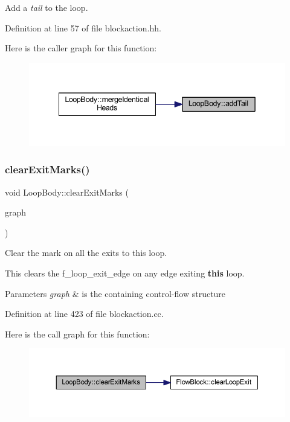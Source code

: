Add a {\itshape tail} to the loop. 



Definition at line 57 of file blockaction.\+hh.

Here is the caller graph for this function\+:
\nopagebreak
\begin{figure}[H]
\begin{center}
\leavevmode
\includegraphics[width=342pt]{class_loop_body_a6f9865236680edf3495208859639ce03_icgraph}
\end{center}
\end{figure}
\mbox{\label{class_loop_body_a0864eadb313ff31a3075bf916018be8e}} 
\subsubsection{\texorpdfstring{clearExitMarks()}{clearExitMarks()}}
{\footnotesize\ttfamily void Loop\+Body\+::clear\+Exit\+Marks (\begin{DoxyParamCaption}\item[{\mbox{\hyperlink{class_flow_block}{Flow\+Block}} $\ast$}]{graph }\end{DoxyParamCaption})}



Clear the mark on all the exits to this loop. 

This clears the f\+\_\+loop\+\_\+exit\+\_\+edge on any edge exiting {\bfseries{this}} loop. 
\begin{DoxyParams}{Parameters}
{\em graph} & is the containing control-\/flow structure \\
\hline
\end{DoxyParams}


Definition at line 423 of file blockaction.\+cc.

Here is the call graph for this function\+:
\nopagebreak
\begin{figure}[H]
\begin{center}
\leavevmode
\includegraphics[width=350pt]{class_loop_body_a0864eadb313ff31a3075bf916018be8e_cgraph}
\end{center}
\end{figure}
\mbox{\label{class_loop_body_ad6ed614162d7e081baeb297718c0e58c}} 
